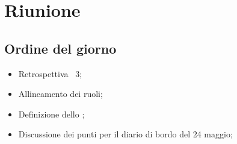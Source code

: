 \section{Riunione}
\subsection{Ordine del giorno}
\begin{itemize}
	\item Retrospettiva \ 3;
	\item Allineamento dei ruoli;
	\item Definizione dello ;
	\item Discussione dei punti per il diario di bordo del 24 maggio;
\end{itemize}

